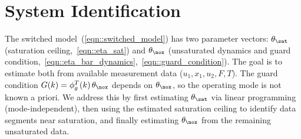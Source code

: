 \section{System Identification \label{sec::sysID}}

The switched model~(\ref{eqn::switched_model}) has two parameter vectors: $\theta_{\sat}$ (saturation
ceiling,~\ref{eqn::eta_sat}) and $\theta_{\nox}$ (unsaturated dynamics and guard
condition,~\ref{eqn::eta_bar_dynamics},~\ref{eqn::guard_condition}). The goal is to estimate both from available
measurement data ($u_1, x_1, u_2, F, T$). The guard condition $G(k) = \phi_g^T(k)\,\theta_{\nox}$ depends on
$\theta_{\nox}$, so the operating mode is not known a priori. We address this by first estimating $\theta_{\sat}$ via
linear programming (mode-independent), then using the estimated saturation ceiling to identify data segments near
saturation, and finally estimating $\theta_{\nox}$ from the remaining unsaturated data.





